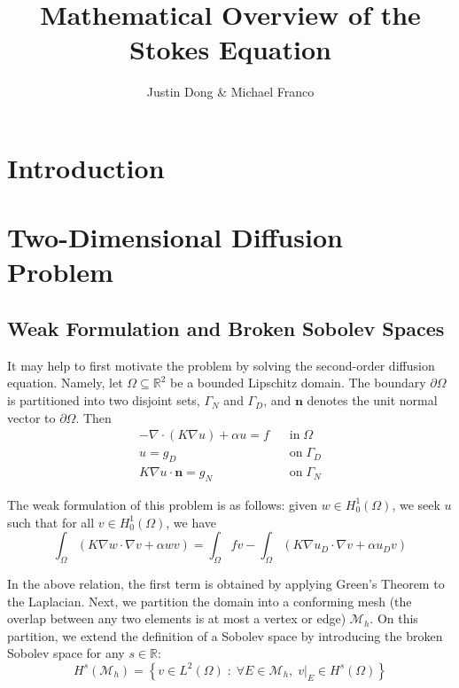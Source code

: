 \documentclass[10pt]{article}
\title{Mathematical Overview of the Stokes Equation}
\author{Justin Dong \& Michael Franco}
\numberwithin{equation}{section}
\begin{document}
	\maketitle
	
	\section{Introduction}
	
	\section{Two-Dimensional Diffusion Problem}
	\subsection{Weak Formulation and Broken Sobolev Spaces}
	It may help to first motivate the problem by solving the second-order diffusion equation. Namely, let $\Omega \subseteq\mathbb{R}^{2}$ be a bounded Lipschitz domain. The boundary $\partial\Omega$ is partitioned into two disjoint sets, $\Gamma_{N}$ and $\Gamma_{D}$, and $\mathbf{n}$ denotes the unit normal vector to $\partial\Omega$. Then
	\begin{align}
		-\nabla\cdot(K\nabla u) + \alpha u = f \;\;\;&\text{in}\;\Omega\\
		u = g_{D} \;\;\;&\text{on}\;\Gamma_{D}\\
		K\nabla u\cdot\mathbf{n} = g_{N} \;\;\;&\text{on}\;\Gamma_{N}
	\end{align}
	
	\noindent The weak formulation of this problem is as follows: given $w\in H_{0}^{1}(\Omega)$, we seek $u$ such that for all $v\in H_{0}^{1}(\Omega)$, we have
	\begin{equation}
		\int_{\Omega} (K\nabla w\cdot\nabla v + \alpha wv) = \int_{\Omega}fv - \int_{\Omega}\left(K\nabla u_{D}\cdot\nabla v + \alpha u_{D}v\right)
	\end{equation}
	
	\noindent In the above relation, the first term is obtained by applying Green's Theorem to the Laplacian. Next, we partition the domain into a conforming mesh (the overlap between any two elements is at most a vertex or edge) $\mathcal{M}_{h}$. On this partition, we extend the definition of a Sobolev space by introducing the broken Sobolev space for any $s\in\mathbb{R}$:
	\begin{equation}
		H^{s}(\mathcal{M}_{h}) = \left\{v\in L^{2}(\Omega)\; :\;\forall E\in\mathcal{M}_{h},\;v|_{E}\in H^{s}(\Omega)\right\}
	\end{equation}
	
\end{document}
